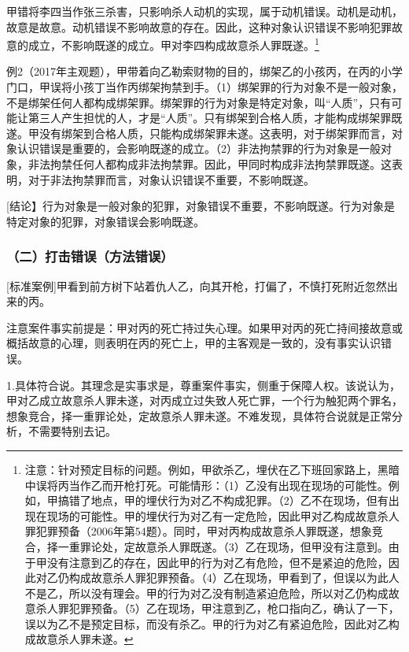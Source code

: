 甲错将李四当作张三杀害，只影响杀人动机的实现，属于动机错误。动机是动机，故意是故意。动机错误不影响故意的存在。因此，这种对象认识错误不影响犯罪故意的成立，不影响既遂的成立。甲对李四构成故意杀人罪既遂。\footnote{注意：针对预定目标的问题。例如，甲欲杀乙，埋伏在乙下班回家路上，黑暗中误将丙当作乙而开枪打死。可能情形：（1）乙没有出现在现场的可能性。例如，甲搞错了地点，甲的埋伏行为对乙不构成犯罪。（2）乙不在现场，但有出现在现场的可能性。甲的埋伏行为对乙有一定危险，因此甲对乙构成故意杀人罪犯罪预备（2006年第54题）。同时，甲对丙构成故意杀人罪既遂，想象竞合，择一重罪论处，定故意杀人罪既遂。（3）乙在现场，但甲没有注意到。由于甲没有注意到乙的存在，因此甲的行为对乙有危险，但不是紧迫的危险，因此对乙仍构成故意杀人罪犯罪预备。（4）乙在现场，甲看到了，但误以为此人不是乙，所以没有理会。甲的行为对乙没有制造紧迫危险，所以对乙仍构成故意杀人罪犯罪预备。（5）乙在现场，甲注意到乙，枪口指向乙，确认了一下，误以为乙不是预定目标，而没有杀乙。甲的行为对乙有紧迫危险，因此对乙构成故意杀人罪未遂。}

例2（2017年主观题），甲带着向乙勒索财物的目的，绑架乙的小孩丙，在丙的小学门口，甲误将小孩丁当作丙绑架拘禁到手。（1）绑架罪的行为对象不是一般对象，不是绑架任何人都构成绑架罪。绑架罪的行为对象是特定对象，叫“人质”，只有可能让第三人产生担忧的人，才是“人质”。只有绑架到合格人质，才能构成绑架罪既遂。甲没有绑架到合格人质，只能构成绑架罪未遂。这表明，对于绑架罪而言，对象认识错误是重要的，会影响既遂的成立。（2）非法拘禁罪的行为对象是一般对象，非法拘禁任何人都构成非法拘禁罪。因此，甲同时构成非法拘禁罪既遂。这表明，对于非法拘禁罪而言，对象认识错误不重要，不影响既遂。

[结论】行为对象是一般对象的犯罪，对象错误不重要，不影响既遂。行为对象是特定对象的犯罪，对象错误会影响既遂。

\subsubsection*{（二）打击错误（方法错误）}

[标准案例]甲看到前方树下站着仇人乙，向其开枪，打偏了，不慎打死附近忽然出来的丙。

注意案件事实前提是：甲对丙的死亡持过失心理。如果甲对丙的死亡持间接故意或概括故意的心理，则表明在丙的死亡上，甲的主客观是一致的，没有事实认识错误。

1.具体符合说。其理念是实事求是，尊重案件事实，侧重于保障人权。该说认为，甲对乙成立故意杀人罪未遂，对丙成立过失致人死亡罪，一个行为触犯两个罪名，想象竞合，择一重罪论处，定故意杀人罪未遂。不难发现，具体符合说就是正常分析，不需要特别去记。

